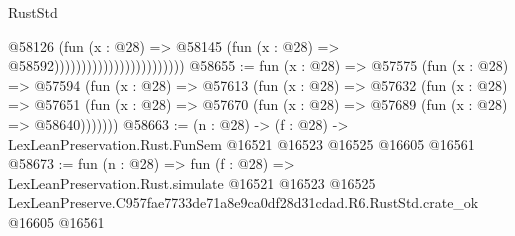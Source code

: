 \begin{lexlean}{RustStd}
\begin{coremodule}
                                              @58126
                                                (fun (x : @28) =>
                                                @58145
                                                  (fun (x : @28) => @58592))))))))))))))))))))))))
@58655 := fun (x : @28) =>
  @57575
    (fun (x : @28) =>
    @57594
      (fun (x : @28) =>
      @57613
        (fun (x : @28) =>
        @57632
          (fun (x : @28) =>
          @57651 (fun (x : @28) => @57670 (fun (x : @28) => @57689 (fun (x : @28) => @58640)))))))
@58663 := (n : @28) ->
  (f : @28) -> LexLeanPreservation.Rust.FunSem @16521 @16523 @16525 @16605 @16561
@58673 := fun (n : @28) =>
  fun (f : @28) =>
  LexLeanPreservation.Rust.simulate
    @16521
    @16523
    @16525
    LexLeanPreserve.C957fae7733de71a8e9ca0df28d31cdad.R6.RustStd.crate_ok
    @16605
    @16561
\end{coremodule}
\end{lexlean}
